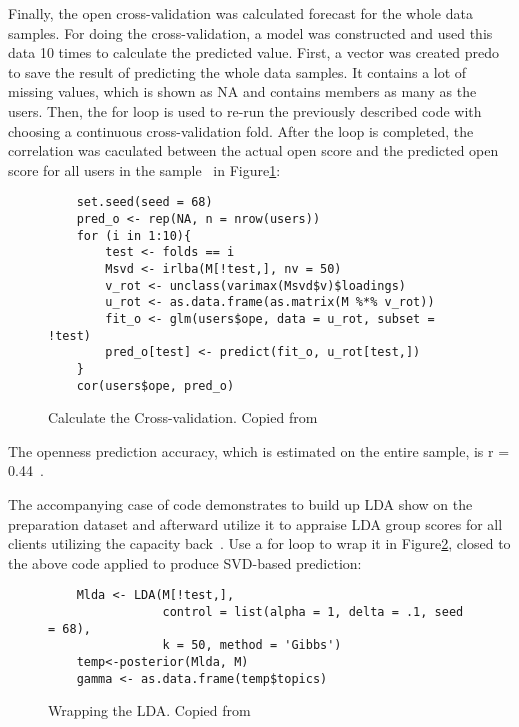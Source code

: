 Finally, the open cross-validation was calculated forecast for the 
whole data samples. For doing the cross-validation,  a model was 
constructed and used this data 10 
times to calculate the predicted value. First, a vector was created
predo to save the result of predicting the whole data samples. 
It contains a lot of 
missing values, which is shown as NA and contains members as many
as the users. 
Then, the for loop is used to re-run the previously described
 code with choosing a continuous cross-validation fold. After the 
loop is completed, the correlation was 
caculated between the actual open score and the predicted open 
score for all users in the sample~\cite{hid515-12} 
in Figure\ref{F:cross1}:

\begin{figure}[htb]
\begin{footnotesize}
\begin{verbatim}
    set.seed(seed = 68)
    pred_o <- rep(NA, n = nrow(users))
    for (i in 1:10){
        test <- folds == i
        Msvd <- irlba(M[!test,], nv = 50)
        v_rot <- unclass(varimax(Msvd$v)$loadings)
        u_rot <- as.data.frame(as.matrix(M %*% v_rot))
        fit_o <- glm(users$ope, data = u_rot, subset = !test)
        pred_o[test] <- predict(fit_o, u_rot[test,])
    }
    cor(users$ope, pred_o)
\end{verbatim}
\end{footnotesize}
\caption{Calculate the Cross-validation. Copied from~\cite{hid515-12}}
\label{F:cross1}
\end{figure}


The openness prediction accuracy, which is estimated on the entire
sample, is r = 0.44~\cite{hid515-12}.

The accompanying case of code demonstrates to 
build up LDA show on the preparation dataset and afterward 
utilize it to 
appraise LDA group scores for all clients utilizing the capacity 
back~\cite{hid515-12}.
Use a for loop to wrap it in Figure\ref{F:wrap}, 
closed to the above code applied to produce SVD-based prediction:

\begin{figure}[htb]
\begin{footnotesize}
\begin{verbatim}
    Mlda <- LDA(M[!test,], 
                control = list(alpha = 1, delta = .1, seed = 68),
                k = 50, method = 'Gibbs')
    temp<-posterior(Mlda, M)
    gamma <- as.data.frame(temp$topics)
\end{verbatim}
\end{footnotesize}
\caption{Wrapping the LDA. Copied from~\cite{hid515-12}}
\label{F:wrap}
\end{figure}

